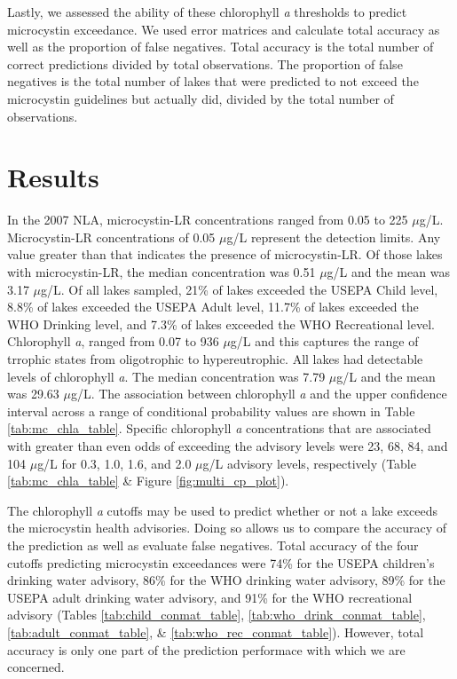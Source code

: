 \documentclass[11pt,]{article}
\begin{document}
Lastly, we assessed the ability of these chlorophyll \emph{a} thresholds
to predict microcystin exceedance. We used error matrices and calculate
total accuracy as well as the proportion of false negatives. Total
accuracy is the total number of correct predictions divided by total
observations. The proportion of false negatives is the total number of
lakes that were predicted to not exceed the microcystin guidelines but
actually did, divided by the total number of observations.

\section{Results}\label{results}

In the 2007 NLA, microcystin-LR concentrations ranged from 0.05 to 225
\(\mu\)g/L. Microcystin-LR concentrations of 0.05 \(\mu\)g/L represent
the detection limits. Any value greater than that indicates the presence
of microcystin-LR. Of those lakes with microcystin-LR, the median
concentration was 0.51 \(\mu\)g/L and the mean was 3.17 \(\mu\)g/L. Of
all lakes sampled, 21\% of lakes exceeded the USEPA Child level, 8.8\%
of lakes exceeded the USEPA Adult level, 11.7\% of lakes exceeded the
WHO Drinking level, and 7.3\% of lakes exceeded the WHO Recreational
level. Chlorophyll \emph{a}, ranged from 0.07 to 936 \(\mu\)g/L and this
captures the range of trrophic states from oligotrophic to
hypereutrophic. All lakes had detectable levels of chlorophyll \emph{a}.
The median concentration was 7.79 \(\mu\)g/L and the mean was 29.63
\(\mu\)g/L. The association between chlorophyll \emph{a} and the upper
confidence interval across a range of conditional probability values are
shown in Table \ref{tab:mc_chla_table}. Specific chlorophyll \emph{a}
concentrations that are associated with greater than even odds of
exceeding the advisory levels were 23, 68, 84, and 104 \(\mu\)g/L for
0.3, 1.0, 1.6, and 2.0 \(\mu\)g/L advisory levels, respectively (Table
\ref{tab:mc_chla_table} \& Figure \ref{fig:multi_cp_plot}).

The chlorophyll \emph{a} cutoffs may be used to predict whether or not a
lake exceeds the microcystin health advisories. Doing so allows us to
compare the accuracy of the prediction as well as evaluate false
negatives. Total accuracy of the four cutoffs predicting microcystin
exceedances were 74\% for the USEPA children's drinking water advisory,
86\% for the WHO drinking water advisory, 89\% for the USEPA adult
drinking water advisory, and 91\% for the WHO recreational advisory
(Tables \ref{tab:child_conmat_table}, \ref{tab:who_drink_conmat_table},
\ref{tab:adult_conmat_table}, \& \ref{tab:who_rec_conmat_table}).
However, total accuracy is only one part of the prediction performace
with which we are concerned.
\end{document}
